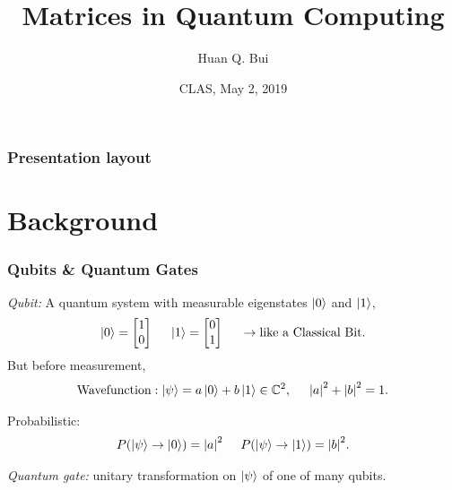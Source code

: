 \documentclass{beamer}
\title{Matrices in Quantum Computing}
\author[Huan Q. Bui] %
{Huan Q. Bui}
\institute[Colby College] %
{
	
	Matrix Analysis
	\and
	Professor Leo Livshits
}
\date{CLAS, May 2, 2019}
\theoremstyle{definition}
\begin{document}
 
\frame{\titlepage}
 
\begin{frame}
\frametitle{Presentation layout}
\tableofcontents
\end{frame}



\section{Background}



\begin{frame}
\frametitle{Qubits \& Quantum Gates}
\textit{Qubit:} A quantum system with measurable eigenstates $\left\vert{0}\right\rangle$ and $\left\vert{1}\right\rangle$,
\begin{align*}
\left\vert{0}\right\rangle = \begin{bmatrix}
1\\0
\end{bmatrix}\hspace{0.5cm} \left\vert{1}\right\rangle = \begin{bmatrix}
0\\1
\end{bmatrix} \hspace{0.5cm} \rightarrow \text{like a Classical Bit.}
\end{align*}
But before measurement,
\begin{align*}
\text{Wavefunction}: \left\vert{\psi}\right\rangle = a\left\vert{0}\right\rangle + b\left\vert{1}\right\rangle \in \mathbb{C}^2,\hspace{0.5cm} \abs{a}^2 + \abs{b}^2 = 1.
\end{align*}

Probabilistic:
\begin{align*}
P(\left\vert{\psi}\right\rangle \to \left\vert{0}\right\rangle) = \abs{a}^2\hspace{0.5cm}
P(\left\vert{\psi}\right\rangle \to \left\vert{1}\right\rangle) = \abs{b}^2.
\end{align*}

\textit{Quantum gate:} unitary transformation on $\left\vert{\psi}\right\rangle$ of one of many qubits. 
\end{frame}
\end{document}
